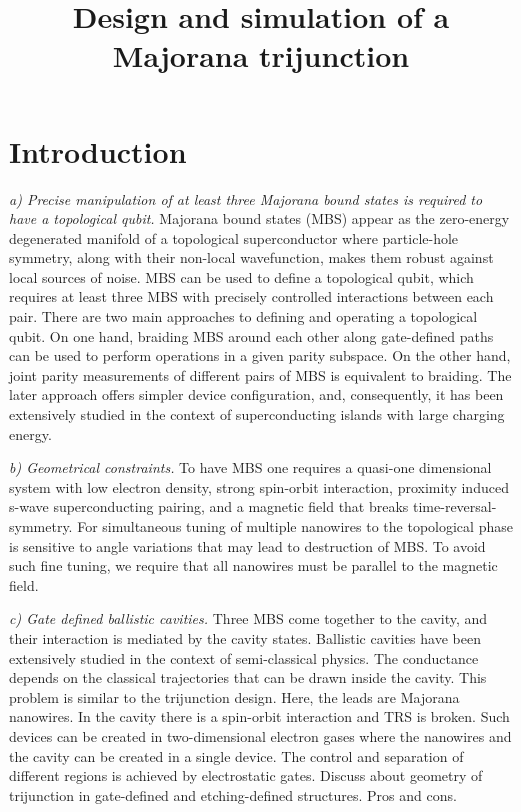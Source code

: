 \documentclass[10pt,twocolumn,aps,superscriptaddress, floatfix,notitlepage]{revtex4-1}
\begin{document}
\title{Design and simulation of a Majorana trijunction}

\begin{abstract}

\end{abstract}
\maketitle


\section{Introduction}

\textit{a) Precise manipulation of at least three Majorana bound states is required to have a topological qubit.} Majorana bound states (MBS) appear as the zero-energy degenerated manifold of a topological superconductor where particle-hole symmetry, along with their non-local wavefunction, makes them robust against local sources of noise. MBS can be used to define a topological qubit, which requires at least three MBS with precisely controlled interactions between each pair\cite{Aasen2016}. There are two main approaches to defining and operating a topological qubit. On one hand, braiding MBS around each other along gate-defined paths can be used to perform operations in a given parity subspace\cite{Sau2011,Alicea2011,Bauer2018,Zhou2021}. On the other hand, joint parity measurements of different pairs of MBS is equivalent to braiding\cite{Plugge2017,Li2018,Hell2016,Karzig2017}. The later approach offers simpler device configuration, and, consequently, it has been extensively studied in the context of superconducting islands with large charging energy.

\textit{b) Geometrical constraints.} To have MBS one requires a quasi-one dimensional system with low electron density, strong spin-orbit interaction, proximity induced s-wave superconducting pairing, and a magnetic field that breaks time-reversal-symmetry. For simultaneous tuning of multiple nanowires to the topological phase is sensitive to angle variations that may lead to destruction of MBS. To avoid such fine tuning, we require that all nanowires must be parallel to the magnetic field.

\textit{c) Gate defined ballistic cavities.}  Three MBS come together to the cavity, and their interaction is mediated by the cavity states. Ballistic cavities have been extensively studied in the context of semi-classical physics. The conductance depends on the classical trajectories that can be drawn inside the cavity\cite{Zhang2017,Nazmitdinov2002,Wirtz1997}. This problem is similar to the trijunction design. Here, the leads are Majorana nanowires. In the cavity there is a spin-orbit interaction and TRS is broken. Such devices can be created in two-dimensional electron gases\cite{Moehle2021} where the nanowires and the cavity can be created in a single device. The control and separation of different regions is achieved by electrostatic gates\cite{Hell2017}. {\color{red} Discuss about geometry of trijunction in gate-defined and etching-defined structures. Pros and cons.}
\end{document}
